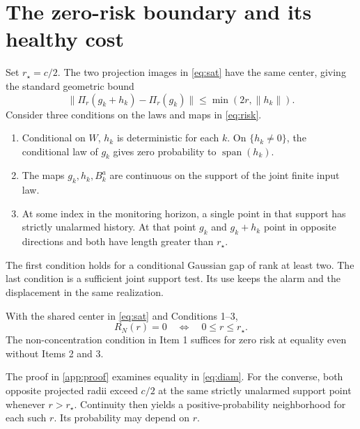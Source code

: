 \section{The zero-risk boundary and its healthy cost}
\label{sec:theory}

Set \(r_\star=c/2\). The two projection images in \eqref{eq:sat} have the same center, giving the standard geometric bound
\begin{equation}
 \|\Pi_r(g_k+h_k)-\Pi_r(g_k)\|\le\min(2r,\|h_k\|).
 \label{eq:diam}
\end{equation}
Consider three conditions on the laws and maps in \eqref{eq:risk}.
\begin{enumerate}
 \item Conditional on \(W\), \(h_k\) is deterministic for each \(k\). On \(\{h_k\ne0\}\), the conditional law of \(g_k\) gives zero probability to \(\operatorname{span}(h_k)\).
 \item The maps \(g_k,h_k,B_k^a\) are continuous on the support of the joint finite input law.
 \item At some index in the monitoring horizon, a single point in that support has strictly unalarmed history. At that point \(g_k\) and \(g_k+h_k\) point in opposite directions and both have length greater than \(r_\star\).
\end{enumerate}
The first condition holds for a conditional Gaussian gap of rank at least two. The last condition is a sufficient joint support test. Its use keeps the alarm and the displacement in the same realization.

\begin{theorem}
\label{thm:boundary}
With the shared center in \eqref{eq:sat} and Conditions 1--3,
\begin{equation}
 R_N(r)=0\quad\Longleftrightarrow\quad 0\le r\le r_\star .
 \label{eq:equiv}
\end{equation}
The non-concentration condition in Item 1 suffices for zero risk at equality even without Items 2 and 3.
\end{theorem}

The proof in \ref{app:proof} examines equality in \eqref{eq:diam}. For the converse, both opposite projected radii exceed \(c/2\) at the same strictly unalarmed support point whenever \(r>r_\star\). Continuity then yields a positive-probability neighborhood for each such \(r\). Its probability may depend on \(r\).

